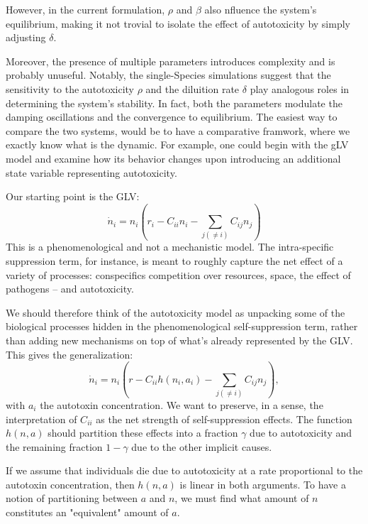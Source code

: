 \documentclass[11pt,a4paper,fleqn]{article}
\begin{document}
However, in the current formulation, $\rho$ and $\beta$ also nfluence the system's equilibrium, making it
not trovial to isolate the effect of autotoxicity by simply 
adjusting $\delta$. 

Moreover, the presence of multiple parameters introduces complexity and is probably
unuseful. Notably, the single-Species simulations suggest that the sensitivity to the autotoxicity $\rho$ and the 
diluition rate $\delta$ play analogous roles in determining the system's stability. 
In fact, both the parameters modulate the damping oscillations and the convergence to equilibrium. 
The easiest way to compare the two systems, would be to have a comparative framwork,
where we exactly know what is the dynamic. For example, one could begin with the gLV model and 
examine how its behavior changes upon introducing an additional state variable representing autotoxicity. 

Our starting point is the GLV:
\begin{equation}
\dot{n}_i = n_i\left( r_i - C_{ii} n_i - \sum_{j(\neq i)} C_{ij} n_j \right)
\label{eq:glv1}
\end{equation}
This is a phenomenological and not a mechanistic model. 
The intra-specific suppression term, for instance, is meant to roughly capture the net effect of a variety of processes: conspecifics competition over resources, space, the effect of pathogens -- and autotoxicity. 

We should therefore think of the autotoxicity model as unpacking some of the biological processes hidden in the phenomenological self-suppression term, 
rather than adding new mechanisms on top of what's already represented by the GLV. This gives the generalization:
\begin{equation}
\dot{n}_i = n_i\left( r - C_{ii} h(n_i,a_i) - \sum_{j(\neq i)} C_{ij} n_j \right),
\end{equation}
with $a_i$ the autotoxin concentration. 
We want to preserve, in a sense, the interpretation of $C_{ii}$ as the net strength of self-suppression effects. 
The function $h(n,a)$ should partition these effects into a fraction $\gamma$ due to autotoxicity and the remaining fraction $1-\gamma$ due to the other implicit causes.

If we assume that individuals die due to autotoxicity at a rate proportional to the autotoxin concentration, then $h(n,a)$ is linear in both arguments. To have a notion of partitioning between $a$ and $n$, we must find what amount of $n$ constitutes an "equivalent" amount of $a$.
\end{document}
